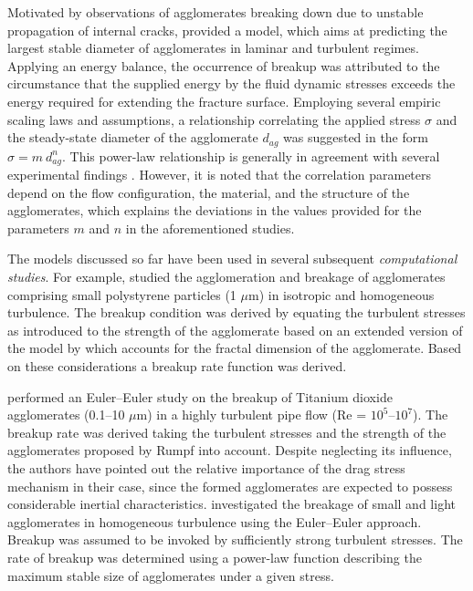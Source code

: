 Motivated by observations of agglomerates breaking down due to
unstable propagation of internal cracks, \citet{zaccone2009} provided
a model, which aims at predicting the largest stable diameter of
agglomerates in laminar and turbulent regimes. Applying an energy
balance, the occurrence of breakup was attributed to the circumstance
that the supplied energy by the fluid dynamic stresses exceeds the
energy required for extending the fracture surface. Employing several
empiric scaling laws and assumptions, a relationship correlating the
applied stress $\sigma$ and the steady-state diameter of the
agglomerate $d_{ag}$ was suggested in the form $\sigma = m \:
d_{ag}^n$. This power-law relationship is generally in agreement with
several experimental findings
\citep[e.g.,][]{adler1979,sonntag1986structure,serra1997aggregation,
  wengeler2007turbulent,soos2008effect,ammar2012,saha2015breakup}.
However, it is noted that the correlation parameters depend on the
flow configuration, the material, and the structure of the
agglomerates, which explains the deviations in the values provided for
the parameters $m$ and $n$ in the aforementioned studies. \newline

The models discussed so far have been used in several subsequent
\emph{computational studies}. For example, \citet{disskusters1991}
studied the agglomeration and breakage of agglomerates comprising
small polystyrene particles (1 $\mu$m) in isotropic and homogeneous
turbulence. The breakup condition was derived by equating the
turbulent stresses as introduced to the strength of the agglomerate
based on an extended version of the model by \citet{rumpf1962} which
accounts for the fractal dimension of the agglomerate. Based on these
considerations a breakup rate function was derived.

\citet{ammar2012} performed an Euler--Euler study on the breakup of
Titanium dioxide agglomerates (0.1--10 $\mu$m) in a highly turbulent
pipe flow (Re = $10^5$--$10^7$). The breakup rate was derived taking 
the
turbulent stresses and the strength of the agglomerates proposed by
Rumpf into account. Despite neglecting its influence, the authors have
pointed out the relative importance of the drag stress mechanism in
their case, since the formed agglomerates are expected to possess
considerable inertial characteristics. \citet{babler2008} investigated
the breakage of small and light agglomerates in homogeneous turbulence
using the Euler--Euler approach. Breakup was assumed to be invoked by
sufficiently strong turbulent stresses. The rate of breakup was
determined using a power-law function describing the maximum stable
size of agglomerates under a given stress. \newline 

